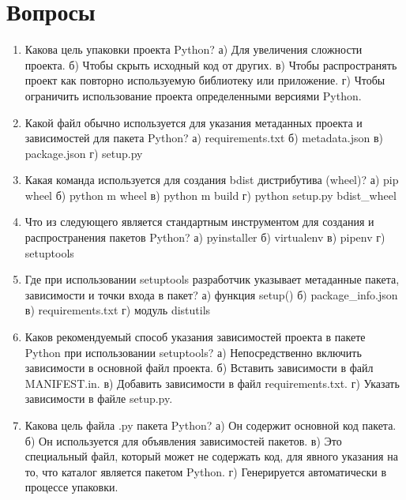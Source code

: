 \documentclass[letterpaper,10pt,russian]{sphinxmanual}
\begin{document}
\sphinxstepscope


\section{Вопросы}
\label{\detokenize{educational_materials/packaging/quiz:id1}}\label{\detokenize{educational_materials/packaging/quiz::doc}}\begin{enumerate}
%
\item {} 
\sphinxAtStartPar
Какова цель упаковки проекта Python?
а) Для увеличения сложности проекта.
б) Чтобы скрыть исходный код от других.
в) Чтобы распространять проект как повторно используемую библиотеку или приложение.
г) Чтобы ограничить использование проекта определенными версиями Python.

\item {} 
\sphinxAtStartPar
Какой файл обычно используется для указания метаданных проекта и зависимостей для пакета Python?
а) requirements.txt
б) metadata.json
в) package.json
г) setup.py

\item {} 
\sphinxAtStartPar
Какая команда используется для создания bdist дистрибутива (wheel)?
а) pip wheel
б) python \sphinxhyphen{}m wheel
в) python \sphinxhyphen{}m build
г) python setup.py bdist\_wheel

\item {} 
\sphinxAtStartPar
Что из следующего является стандартным инструментом для создания и распространения пакетов Python?
а) pyinstaller
б) virtualenv
в) pipenv
г) setuptools

\item {} 
\sphinxAtStartPar
Где при использовании setuptools разработчик указывает метаданные пакета, зависимости и точки входа в пакет?
а) функция setup()
б) package\_info.json
в) requirements.txt
г) модуль distutils

\item {} 
\sphinxAtStartPar
Каков рекомендуемый способ указания зависимостей проекта в пакете Python при использовании setuptools?
а) Непосредственно включить зависимости в основной файл проекта.
б) Вставить зависимости в файл MANIFEST.in.
в) Добавить зависимости в файл requirements.txt.
г) Указать зависимости в файле setup.py.

\item {} 
\sphinxAtStartPar
Какова цель файла .py пакета Python?
а) Он содержит основной код пакета.
б) Он используется для объявления зависимостей пакетов.
в) Это специальный файл, который может не содержать код, для явного указания на то, что каталог является пакетом Python.
г) Генерируется автоматически в процессе упаковки.


\end{enumerate}
\end{document}
